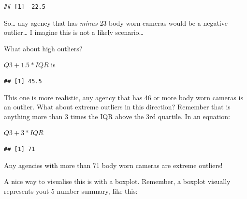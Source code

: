\documentclass[
]{book}
\newenvironment{Shaded}{\begin{snugshade}}{\end{snugshade}}
\newcommand{\AttributeTok}[1]{\textcolor[rgb]{0.77,0.63,0.00}{#1}}
\newcommand{\ConstantTok}[1]{\textcolor[rgb]{0.00,0.00,0.00}{#1}}
\newcommand{\DecValTok}[1]{\textcolor[rgb]{0.00,0.00,0.81}{#1}}
\newcommand{\FloatTok}[1]{\textcolor[rgb]{0.00,0.00,0.81}{#1}}
\newcommand{\FunctionTok}[1]{\textcolor[rgb]{0.00,0.00,0.00}{#1}}
\newcommand{\NormalTok}[1]{#1}
\newcommand{\SpecialCharTok}[1]{\textcolor[rgb]{0.00,0.00,0.00}{#1}}
\begin{document}
\begin{verbatim}
## [1] -22.5
\end{verbatim}

So\ldots{} any agency that has \emph{minus} 23 body worn cameras would be a negative outlier\ldots{} I imagine this is not a likely scenario\ldots{}

What about high outliers?

\(Q3 + 1.5*IQR\) is

\begin{Shaded}
\end{Shaded}

\begin{verbatim}
## [1] 45.5
\end{verbatim}

This one is more realistic, any agency that has 46 or more body worn cameras is an outlier. What about extreme outliers in this direction? Remember that is anything more than 3 times the IQR above the 3rd quartile. In an equation:

\(Q3 + 3*IQR\)

\begin{Shaded}
\end{Shaded}

\begin{verbatim}
## [1] 71
\end{verbatim}

Any agencies with more than 71 body worn cameras are extreme outliers!

A nice way to visualise this is with a boxplot. Remember, a boxplot visually represents yout 5-number-summary, like this:
\end{document}
